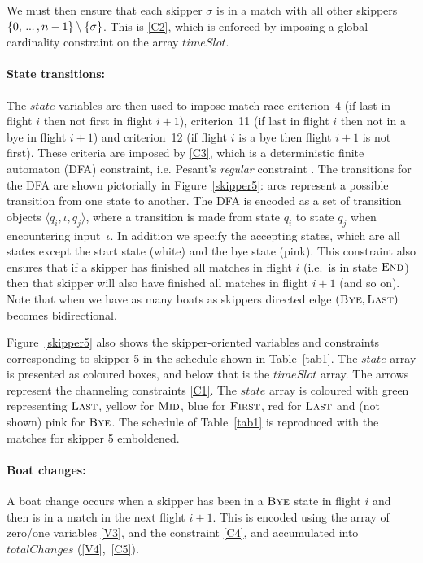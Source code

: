 \documentclass{llncs}
\newcommand{\timeSlot}{\mathit{timeSlot}}
\newcommand{\state}{\mathit{state}}
\newcommand{\totalChanges}{\mathit{totalChanges}}
\newcommand{\FIRST}{\textnormal{\textsc{First}}}
\newcommand{\MID}{\textnormal{\textsc{Mid}}}
\newcommand{\LAST}{\textnormal{\textsc{Last}}}
\newcommand{\END}{\textnormal{\textsc{End}}}
\newcommand{\BYE}{\textnormal{\textsc{Bye}}}
\newcommand\nldots{\,\hbox to 0.8em{.\hss.\hss.}\,}
\begin{document}
We must then ensure that each skipper $\sigma$ is in a match with all other skippers $\{0, \nldots,
n-1\} \setminus \{\sigma\}$. This is \eqref{C2}, which is enforced by imposing a global
cardinality constraint \cite{globCard} on the array $\timeSlot$.

\paragraph{State transitions:} The $\state$ variables are then used to impose match race criterion~4
(if last in flight $i$ then not first in flight $i+1$), criterion~11 (if last in flight $i$ then not
in a bye in flight $i+1$) and criterion~12 (if flight $i$ is a bye then flight $i+1$ is not first).
These criteria are imposed by \eqref{C3}, which is a deterministic finite automaton (DFA) constraint, i.e. Pesant's \emph{regular} constraint 
\cite{Pesant04}. The transitions for the DFA are shown pictorially in Figure~\ref{skipper5}: arcs
represent a possible transition from one state to another. The DFA is encoded as a set of transition objects
$\langle q_{i},\iota,q_{j} \rangle$, where a transition is made from state $q_{i}$ to state $q_{j}$
when encountering input~$\iota$. In addition we specify the accepting states, which are all states
except the start state (white) and the bye state (pink).  This constraint also ensures that if a
skipper has finished all matches in flight $i$ (i.e.\ is in state $\END$) then that skipper will also have
finished all matches in flight $i+1$ (and so on). Note that when we have as many boats as skippers directed edge $(\BYE,\LAST)$ becomes bidirectional.

Figure~\ref{skipper5} also shows the skipper-oriented variables and constraints corresponding to
skipper 5 in the schedule shown in Table~\ref{tab1}. The $\state$ array is presented as coloured boxes, and
below that is the $\timeSlot$ array. The arrows represent the channeling constraints \eqref{C1}. The
$\state$ array is coloured with green representing $\LAST$, yellow for $\MID$, blue for $\FIRST$,
red for $\LAST$ and (not shown) pink for $\BYE$. The schedule of Table~\ref{tab1} is reproduced with
the matches for skipper 5 emboldened. 

\paragraph{Boat changes:} A boat change occurs when a skipper has been in a $\BYE$ state in flight
$i$ and then is in a match in the next flight $i+1$.  This is encoded using the array of zero/one
variables \eqref{V3}, and the constraint \eqref{C4}, and accumulated into $\totalChanges$
(\ref{V4},~\ref{C5}).
\end{document}
